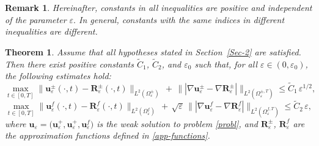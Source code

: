 \documentclass[reqno]{amsart}            %
\newtheorem{theorem}{Theorem}[section]
\newtheorem{remark}{Remark}[section]
\numberwithin{equation}{section}
\begin{document}
	\begin{remark}
		Hereinafter, constants in all inequalities are positive and independent of the parameter $\varepsilon.$ In general, constants with the same indices in different inequalities are different.
	\end{remark}
	
	\begin{theorem}\label{main theorem}
		Assume that all hypotheses stated in Section~\ref{Sec-2} are satisfied. Then there exist positive constants 
		$\tilde{C}_1$, $\tilde{C}_2$, and $\varepsilon_0$ such that, for all 
		$\varepsilon \in (0,\varepsilon_0)$, the following estimates hold: 
		\begin{equation}\label{main-est-1}
			\max_{t\in [0,T]} \|\mathbf{u}^\pm_\varepsilon(\cdot,t) - \mathbf{R}^\pm_\varepsilon(\cdot,t)\|_{L^2(\Omega_\varepsilon^{\pm})} \, + \, 
			\||\nabla \mathbf{u}^\pm_\varepsilon - \nabla\mathbf{R}^\pm_\varepsilon|\|_{L^2(\Omega_\varepsilon^{\pm,T})} \le \tilde{C}_1 \, \varepsilon^{1/2},
		\end{equation}	
		\begin{equation}\label{main-est-2}
			\max_{t\in [0,T]} \|\mathbf{u}^f_\varepsilon(\cdot,t) - \mathbf{R}^f_\varepsilon(\cdot,t)\|_{L^2(\Omega_\varepsilon^{f})} \, + \, 
			\sqrt{\varepsilon} \, \||\nabla \mathbf{u}^f_\varepsilon - \nabla\mathbf{R}^f_\varepsilon|\|_{L^2(\Omega_\varepsilon^{f,T})} \le \tilde{C}_2 \, \varepsilon,
		\end{equation}
		where $\mathbf{u}_\varepsilon = \big(\mathbf{u}^+_\varepsilon, \mathbf{u}^+_\varepsilon, \mathbf{u}^f_\varepsilon \big)$ is the weak solution to problem \eqref{probl}, and  $\mathbf{R}^\pm_\varepsilon$,  $\mathbf{R}^f_\varepsilon$ are the approximation functions defined in 
		\eqref{app-functions}.
	\end{theorem}
	
\end{document}
